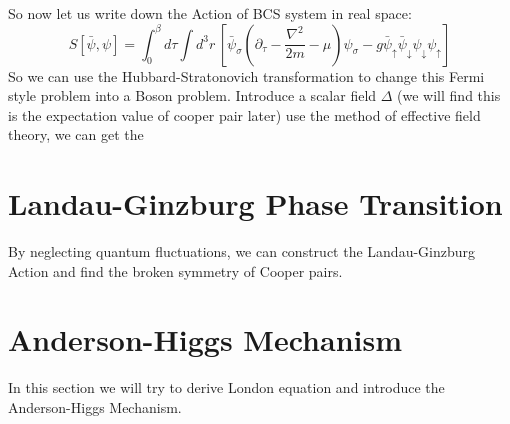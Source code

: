 \documentclass{article}
\newcommand{\uspin}{\uparrow}
\newcommand{\dspin}{\downarrow}
\begin{document}
So now let us write down the Action of BCS system in real space:
\begin{equation}
S[\bar{\psi},\psi] = \int^\beta_0d\tau\int d^3r\,\left[\bar{\psi}_\sigma\left(\partial_\tau-\frac{\nabla^2}{2m}-\mu\right)\psi_\sigma - g\bar{\psi}_\uspin\bar{\psi}_\dspin\psi_\dspin\psi_\uspin\right]
\end{equation}
So we can use the Hubbard-Stratonovich transformation to change this Fermi style problem into a Boson problem. Introduce a scalar field $\Delta$ (we will find this is the expectation value of cooper pair later) use the method of effective field theory, we can get the 

\section{Landau-Ginzburg Phase Transition}
By neglecting quantum fluctuations, we can construct the Landau-Ginzburg Action and find the broken symmetry of Cooper pairs. 

\section{Anderson-Higgs Mechanism}
In this section we will try to derive London equation and introduce the Anderson-Higgs Mechanism.
\end{document}
